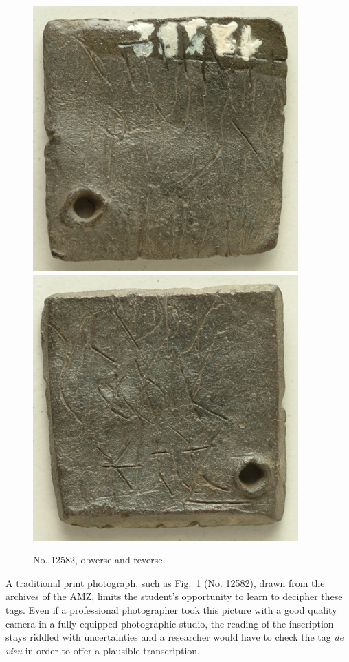 \documentclass[amsthm,ebook]{saparticle}
\begin{document}
\begin{figure}[!h]
\centering
\includegraphics[scale=0.25]{EAGLE16lameetalteaching-img002.jpg}
\includegraphics[scale=0.25]{EAGLE16lameetalteaching-img001.jpg}
\caption{No. 12582, obverse and reverse.}
\label{fig:12582}
\end{figure}

\newpage
 A traditional print photograph, such as Fig.~\ref{fig:12582} (No. 12582), drawn from the archives of the AMZ, limits the student’s
opportunity to learn to decipher these tags. Even if a professional photographer took this picture with a good quality
camera in a fully equipped photographic studio, the reading of the inscription stays riddled with uncertainties and a
researcher would have to check the tag \emph{de visu} in order to offer a plausible transcription.
\end{document}
